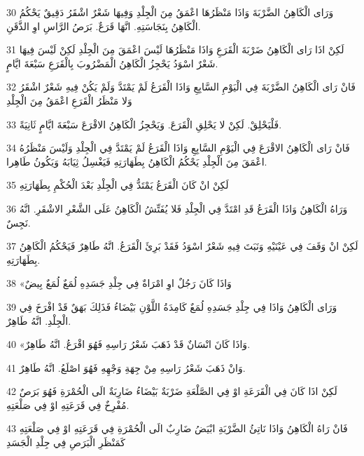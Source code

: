 \par 30 وَرَاى الْكَاهِنُ الضَّرْبَةَ وَاذَا مَنْظَرُهَا اعْمَقُ مِنَ الْجِلْدِ وَفِيهَا شَعْرٌ اشْقَرُ دَقِيقٌ يَحْكُمُ الْكَاهِنُ بِنَجَاسَتِهِ. انَّهَا قَرَعٌ. بَرَصُ الرَّاسِ اوِ الذَّقَنِ.
\par 31 لَكِنْ اذَا رَاى الْكَاهِنُ ضَرْبَةَ الْقَرَعِ وَاذَا مَنْظَرُهَا لَيْسَ اعْمَقَ مِنَ الْجِلْدِ لَكِنْ لَيْسَ فِيهَا شَعْرٌ اسْوَدُ يَحْجِزُ الْكَاهِنُ الْمَضْرُوبَ بِالْقَرَعِ سَبْعَةَ ايَّامٍ.
\par 32 فَانْ رَاى الْكَاهِنُ الضَّرْبَةَ فِي الْيَوْمِ السَّابِعِ وَاذَا الْقَرَعُ لَمْ يَمْتَدَّ وَلَمْ يَكُنْ فِيهِ شَعْرٌ اشْقَرُ وَلا مَنْظَرُ الْقَرَعِ اعْمَقُ مِنَ الْجِلْدِ
\par 33 فَلْيَحْلِقْ. لَكِنْ لا يَحْلِقِ الْقَرَعَ. وَيَحْجِزُ الْكَاهِنُ الاقْرَعَ سَبْعَةَ ايَّامٍ ثَانِيَةً.
\par 34 فَانْ رَاى الْكَاهِنُ الاقْرَعَ فِي الْيَوْمِ السَّابِعِ وَاذَا الْقَرَعُ لَمْ يَمْتَدَّ فِي الْجِلْدِ وَلَيْسَ مَنْظَرُهُ اعْمَقَ مِنَ الْجِلْدِ يَحْكُمُ الْكَاهِنُ بِطَهَارَتِهِ فَيَغْسِلُ ثِيَابَهُ وَيَكُونُ طَاهِرا.
\par 35 لَكِنْ انْ كَانَ الْقَرَعُ يَمْتَدُّ فِي الْجِلْدِ بَعْدَ الْحُكْمِ بِطَهَارَتِهِ
\par 36 وَرَاهُ الْكَاهِنُ وَاذَا الْقَرَعُ قَدِ امْتَدَّ فِي الْجِلْدِ فَلا يُفَتِّشُ الْكَاهِنُ عَلَى الشَّعْرِ الاشْقَرِ. انَّهُ نَجِسٌ.
\par 37 لَكِنْ انْ وَقَفَ فِي عَيْنَيْهِ وَنَبَتَ فِيهِ شَعْرٌ اسْوَدُ فَقَدْ بَرِئَ الْقَرَعُ. انَّهُ طَاهِرٌ فَيَحْكُمُ الْكَاهِنُ بِطَهَارَتِهِ.
\par 38 «وَاذَا كَانَ رَجُلٌ اوِ امْرَاةٌ فِي جِلْدِ جَسَدِهِ لُمَعٌ لُمَعٌ بِيضٌ
\par 39 وَرَاى الْكَاهِنُ وَاذَا فِي جِلْدِ جَسَدِهِ لُمَعٌ كَامِدَةُ اللَّوْنِ بَيْضَاءُ فَذَلِكَ بَهَقٌ قَدْ افْرَخَ فِي الْجِلْدِ. انَّهُ طَاهِرٌ.
\par 40 «وَاذَا كَانَ انْسَانٌ قَدْ ذَهَبَ شَعْرُ رَاسِهِ فَهُوَ اقْرَعُ. انَّهُ طَاهِرٌ.
\par 41 وَانْ ذَهَبَ شَعْرُ رَاسِهِ مِنْ جِهَةِ وَجْهِهِ فَهُوَ اصْلَعُ. انَّهُ طَاهِرٌ.
\par 42 لَكِنْ اذَا كَانَ فِي الْقَرَعَةِ اوْ فِي الصَّلْعَةِ ضَرْبَةٌ بَيْضَاءُ ضَارِبَةٌ الَى الْحُمْرَةِ فَهُوَ بَرَصٌ مُفْرِخٌ فِي قَرَعَتِهِ اوْ فِي صَلْعَتِهِ.
\par 43 فَانْ رَاهُ الْكَاهِنُ وَاذَا نَاتِئُ الضَّرْبَةِ ابْيَضُ ضَارِبٌ الَى الْحُمْرَةِ فِي قَرَعَتِهِ اوْ فِي صَلْعَتِهِ كَمَنْظَرِ الْبَرَصِ فِي جِلْدِ الْجَسَدِ
